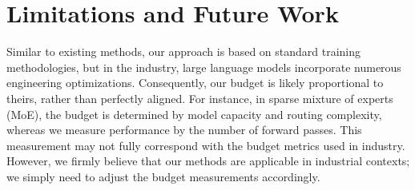 \section{Limitations and Future Work}
\label{appendix:limitation}
Similar to existing methods, our approach is based on standard training methodologies, but in the industry, large language models incorporate numerous engineering optimizations. Consequently, our budget is likely proportional to theirs, rather than perfectly aligned. For instance, in sparse mixture of experts (MoE), the budget is determined by model capacity and routing complexity, whereas we measure performance by the number of forward passes. This measurement may not fully correspond with the budget metrics used in industry. However, we firmly believe that our methods are applicable in industrial contexts; we simply need to adjust the budget measurements accordingly.
